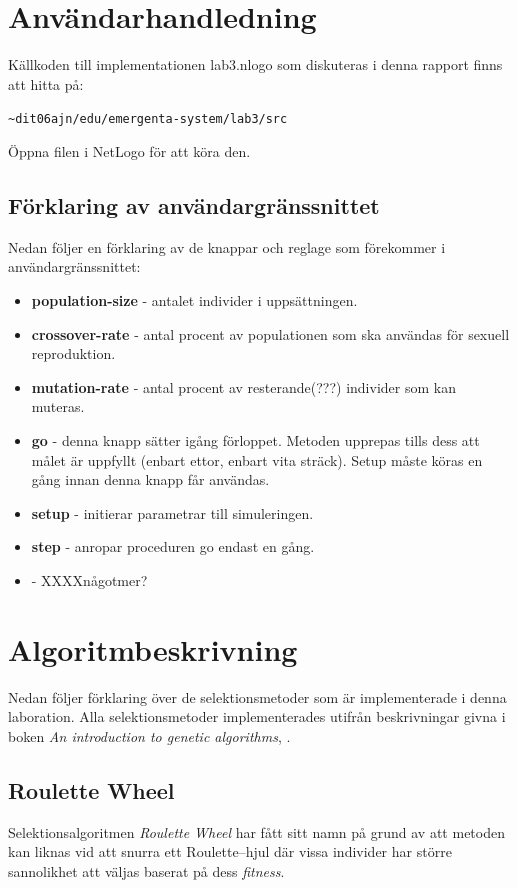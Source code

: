 \documentclass[titlepage, a4paper, 12pt]{article}
\begin{document}
\section{Användarhandledning}
Källkoden till implementationen lab3.nlogo som diskuteras i denna
rapport finns att hitta på:

\verb!~dit06ajn/edu/emergenta-system/lab3/src!

Öppna filen i NetLogo för att köra den.

\subsection{Förklaring av användargränssnittet}
Nedan följer en förklaring av de knappar och reglage som förekommer i
användargränssnittet:

\begin{itemize}
\item \textbf{population-size} - antalet individer i uppsättningen.
\item \textbf{crossover-rate} - antal procent av populationen som ska användas för sexuell reproduktion.
\item \textbf{mutation-rate} - antal procent av resterande(???) individer som kan muteras.
\item \textbf{go} - denna knapp sätter igång förloppet. Metoden upprepas tills dess att målet är uppfyllt (enbart ettor, enbart vita sträck). Setup måste köras en gång innan denna knapp får användas.
\item \textbf{setup} - initierar parametrar till simuleringen.
\item \textbf{step} - anropar proceduren go endast en gång.
\item \textbf{} - XXXXnågotmer?
\end{itemize}

\section{Algoritmbeskrivning}
Nedan följer förklaring över de selektionsmetoder som är
implementerade i denna laboration. Alla selektionsmetoder
implementerades utifrån beskrivningar givna i boken \textit{An
  introduction to genetic algorithms}, \cite{gen-intro}.

\subsection{Roulette Wheel}\label{sec:roulette-wheel}
Selektionsalgoritmen \textit{Roulette Wheel} har fått sitt namn på
grund av att metoden kan liknas vid att snurra ett Roulette–hjul där
vissa individer har större sannolikhet att väljas baserat på dess
\textit{fitness}.
\end{document}
